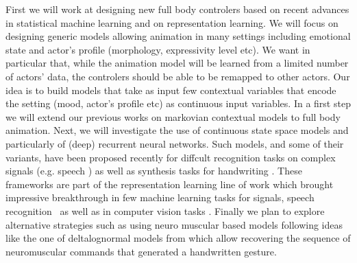 First we will work at designing new full body controlers based on recent advances in statistical machine learning and on representation learning. We will focus on designing generic models allowing animation in many settings including  emotional state and actor's profile (morphology, expressivity level etc). We want in particular that, while the animation model will be learned from a limited number of actors' data, the controlers should be able to be remapped to other actors. 
Our idea is to build models that take as input few contextual variables that encode the setting (mood, actor's profile etc) as continuous input variables. 
In a first step we will extend our previous works on markovian contextual models \cite{Radenen2014, Ding2013, Ding2014} to full body animation. 
Next, we will investigate the use of continuous state space models and particularly of (deep) recurrent neural networks. Such models, and some of their variants, have been proposed recently for diffcult recognition tasks on complex signals (e.g. speech \cite{DBLP:journals/taslp/Abdel-HamidMJDPY14}) as well as synthesis tasks for handwriting \cite{DBLP:journals/corr/Graves13}. These frameworks are part of the representation learning line of work which brought impressive breakthrough in few machine learning tasks for signals, speech recognition \cite{} as well as in computer vision tasks \cite{}. 
Finally we plan to explore alternative strategies such as using neuro muscular based models following ideas like the one of deltalognormal models from \cite{DBLP:conf/icfhr/FischerPOS14} which allow recovering the sequence of neuromuscular commands that generated a handwritten gesture. 



